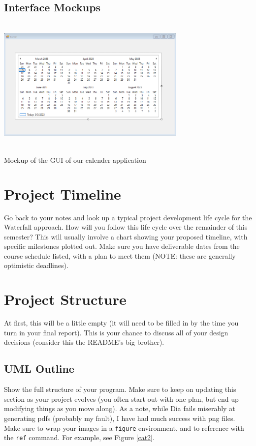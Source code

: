 \documentclass[10pt,conference,onecolumn,compsoc]{IEEEtran}
\begin{document}
\subsection{Interface Mockups}
\includegraphics[height=250px, width=350px]{gui.png}
\break
\caption{Mockup of the GUI of our calender application}
\label{GUI Mockup}




\section{Project Timeline}
Go back to your notes and look up a typical project development life cycle for the Waterfall approach.  How will you follow this life cycle over the remainder of this semester?  This will usually involve a chart showing your proposed timeline, with specific milestones plotted out.  Make sure you have deliverable dates from the course schedule listed, with a plan to meet them (NOTE: these are generally optimistic deadlines).

\section{Project Structure}
At first, this will be a little empty (it will need to be filled in by the time you turn in your final report).  This is your chance to discuss all of your design decisions (consider this the README's big brother).

\subsection{UML Outline}
Show the full structure of your program.  Make sure to keep on updating this section as your project evolves (you often start out with one plan, but end up modifying things as you move along).  As a note, while Dia fails miserably at generating pdfs (probably my fault), I have had much success with png files.  Make sure to wrap your images in a \texttt{figure} environment, and to reference with the \texttt{ref} command.  For example, see Figure \ref{cat2}.
\end{document}
